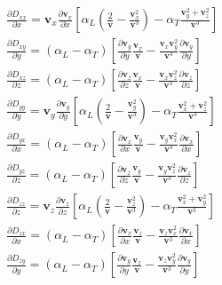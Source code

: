 \begin{equation}\label{DerivativeDispersionCoefficient}
\begin{array}{lllllllll}
& \frac{\partial D _{xx}}{\partial x}=\mathbf{v}_x\frac{\partial \mathbf{v}_x}{\partial x}\left [
\alpha _L \left (\frac {2}{\mathbf{v}} - \frac {\mathbf{v}_x ^2}{\mathbf{v}^3} \right ) - \alpha _T \frac {\mathbf{v}_y ^2 + \mathbf{v}_z ^2}{\mathbf{v}^3} \right ] \\
& \frac{\partial D _{xy}}{\partial y}=(\alpha _L - \alpha _T)\left [\frac{\partial \mathbf{v}_y}{\partial y}
\frac{\mathbf{v}_x}{\mathbf{v}} - \frac{\mathbf{v}_x \mathbf{v}_y^2}{\mathbf{v}^3} \frac{\partial \mathbf{v}_y}{\partial y} \right ] \\
& \frac{\partial D _{xz}}{\partial z}=(\alpha _L - \alpha _T)\left [\frac{\partial \mathbf{v}_z}{\partial z}
\frac{\mathbf{v}_x}{\mathbf{v}} - \frac{\mathbf{v}_x \mathbf{v}_z^2}{\mathbf{v}^3} \frac{\partial \mathbf{v}_z}{\partial z} \right ] \\
& \frac{\partial D _{yy}}{\partial y}=\mathbf{v}_y\frac{\partial \mathbf{v}_y}{\partial y}\left [
\alpha _L \left (\frac {2}{\mathbf{v}} - \frac {\mathbf{v}_y ^2}{\mathbf{v}^3} \right ) - \alpha _T \frac {\mathbf{v}_x ^2 + \mathbf{v}_z ^2}{\mathbf{v}^3} \right ] \\
& \frac{\partial D _{yx}}{\partial x}=(\alpha _L - \alpha _T)\left [\frac{\partial \mathbf{v}_x}{\partial x}
\frac{\mathbf{v}_y}{\mathbf{v}} - \frac{\mathbf{v}_y \mathbf{v}_x^2}{\mathbf{v}^3} \frac{\partial \mathbf{v}_x}{\partial x} \right ] \\
& \frac{\partial D _{yz}}{\partial z}=(\alpha _L - \alpha _T)\left [\frac{\partial \mathbf{v}_z}{\partial z}
\frac{\mathbf{v}_y}{\mathbf{v}} - \frac{\mathbf{v}_y \mathbf{v}_z^2}{\mathbf{v}^3} \frac{\partial \mathbf{v}_z}{\partial z} \right ] \\
& \frac{\partial D _{zz}}{\partial z}=\mathbf{v}_z\frac{\partial \mathbf{v}_z}{\partial z}\left [
\alpha _L \left (\frac {2}{\mathbf{v}} - \frac {\mathbf{v}_z ^2}{\mathbf{v}^3} \right ) - \alpha _T \frac {\mathbf{v}_x ^2 + \mathbf{v}_y ^2}{\mathbf{v}^3} \right ] \\
& \frac{\partial D _{zx}}{\partial x}=(\alpha _L - \alpha _T)\left [\frac{\partial \mathbf{v}_x}{\partial x}
\frac{\mathbf{v}_z}{\mathbf{v}} - \frac{\mathbf{v}_z \mathbf{v}_x^2}{\mathbf{v}^3} \frac{\partial \mathbf{v}_x}{\partial x} \right ] \\
& \frac{\partial D _{zy}}{\partial y}=(\alpha _L - \alpha _T)\left [\frac{\partial \mathbf{v}_y}{\partial y}
\frac{\mathbf{v}_z}{\mathbf{v}} - \frac{\mathbf{v}_z \mathbf{v}_y^2}{\mathbf{v}^3} \frac{\partial \mathbf{v}_y}{\partial y} \right ] \\
\end{array}
\end{equation}

